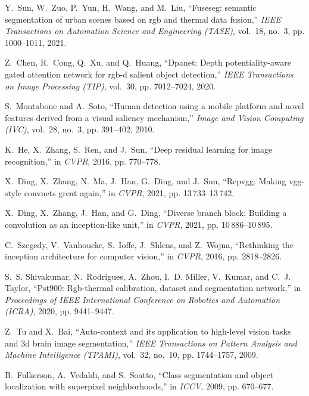 \documentclass[10.5pt,twocolumn,journal,letterpaper]{IEEEtran}
\begin{document}
\begin{thebibliography}{10}
	Y.~Sun, W.~Zuo, P.~Yun, H.~Wang, and M.~Liu, ``Fuseseg: semantic segmentation
	of urban scenes based on rgb and thermal data fusion,'' \emph{IEEE
		Transactions on Automation Science and Engineering (TASE)}, vol.~18, no.~3,
	pp. 1000--1011, 2021.
	
	Z.~Chen, R.~Cong, Q.~Xu, and Q.~Huang, ``Dpanet: Depth potentiality-aware gated
	attention network for rgb-d salient object detection,'' \emph{IEEE
		Transactions on Image Processing (TIP)}, vol.~30, pp. 7012--7024, 2020.
	
	S.~Montabone and A.~Soto, ``Human detection using a mobile platform and novel
	features derived from a visual saliency mechanism,'' \emph{Image and Vision
		Computing (IVC)}, vol.~28, no.~3, pp. 391--402, 2010.
	
	K.~He, X.~Zhang, S.~Ren, and J.~Sun, ``Deep residual learning for image
	recognition,'' in \emph{CVPR}, 2016, pp. 770--778.
	
	X.~Ding, X.~Zhang, N.~Ma, J.~Han, G.~Ding, and J.~Sun, ``Repvgg: Making
	vgg-style convnets great again,'' in \emph{CVPR}, 2021, pp. 13\,733--13\,742.
	
	X.~Ding, X.~Zhang, J.~Han, and G.~Ding, ``Diverse branch block: Building a
	convolution as an inception-like unit,'' in \emph{CVPR}, 2021, pp.
	10\,886--10\,895.
	
	C.~Szegedy, V.~Vanhoucke, S.~Ioffe, J.~Shlens, and Z.~Wojna, ``Rethinking the
	inception architecture for computer vision,'' in \emph{CVPR}, 2016, pp.
	2818--2826.
	
	S.~S. Shivakumar, N.~Rodrigues, A.~Zhou, I.~D. Miller, V.~Kumar, and C.~J.
	Taylor, ``Pst900: Rgb-thermal calibration, dataset and segmentation
	network,'' in \emph{Proceedings of IEEE International Conference on Robotics
		and Automation (ICRA)}, 2020, pp. 9441--9447.
	
	Z.~Tu and X.~Bai, ``Auto-context and its application to high-level vision tasks
	and 3d brain image segmentation,'' \emph{IEEE Transactions on Pattern
		Analysis and Machine Intelligence (TPAMI)}, vol.~32, no.~10, pp. 1744--1757,
	2009.
	
	B.~Fulkerson, A.~Vedaldi, and S.~Soatto, ``Class segmentation and object
	localization with superpixel neighborhoods,'' in \emph{ICCV}, 2009, pp.
	670--677.
	

\end{thebibliography}
\end{document}
